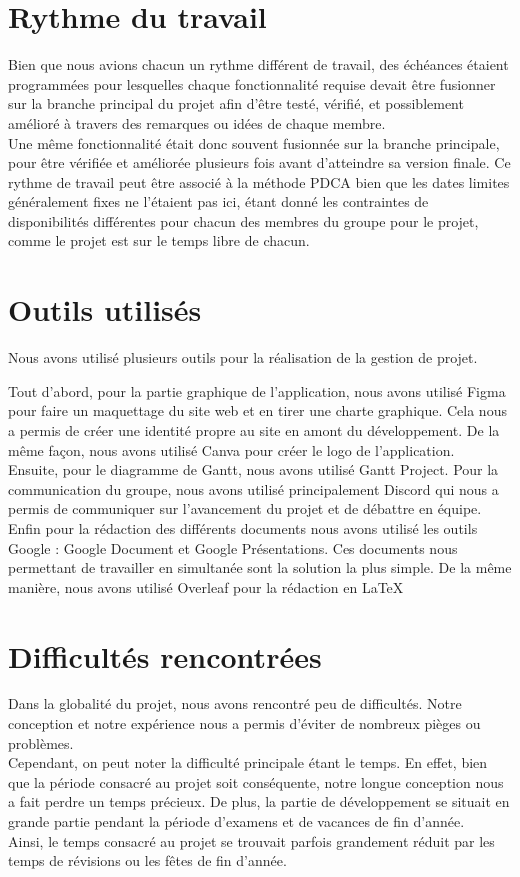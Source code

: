 \documentclass[12pt,titlepage]{report}
\begin{document}
\section{Rythme du travail}
Bien que nous avions chacun un rythme différent de travail, des échéances étaient programmées pour lesquelles chaque fonctionnalité requise devait être fusionner sur la branche principal du projet afin d’être testé, vérifié, et possiblement amélioré à travers des remarques ou idées de chaque membre. \\

Une même fonctionnalité était donc souvent fusionnée sur la branche principale, pour être vérifiée et améliorée plusieurs fois avant d’atteindre sa version finale. 
Ce rythme de travail peut être associé à la méthode PDCA bien que les dates limites généralement fixes ne l’étaient pas ici, étant donné les contraintes de disponibilités différentes pour chacun des membres du groupe pour le projet, comme le projet est sur le temps libre de chacun.

\section{Outils utilisés}
Nous avons utilisé plusieurs outils pour la réalisation de la gestion de projet.

Tout d’abord, pour la partie graphique de l’application, nous avons utilisé Figma pour faire un maquettage du site web et en tirer une charte graphique. Cela nous a permis de créer une identité propre au site en amont du développement. De la même façon, nous avons utilisé Canva pour créer le logo de l’application. \\
Ensuite, pour le diagramme de Gantt, nous avons utilisé Gantt Project. 
Pour la communication du groupe, nous avons utilisé principalement Discord qui nous a permis de communiquer sur l’avancement du projet et de débattre en équipe. \\
Enfin pour la rédaction des différents documents nous avons utilisé les outils Google : Google Document et Google Présentations. Ces documents nous permettant de travailler en simultanée sont la solution la plus simple. De la même manière, nous avons utilisé Overleaf pour la rédaction en LaTeX

\section{Difficultés rencontrées}

Dans la globalité du projet, nous avons rencontré peu de difficultés. Notre conception et notre expérience nous a permis d’éviter de nombreux pièges ou problèmes. \\Cependant, on peut noter la difficulté principale étant le temps. En effet, bien que la période consacré au projet soit conséquente, notre longue conception nous a fait perdre un temps précieux. De plus, la partie de développement se situait en grande partie pendant la période d’examens et de vacances de fin d’année. \\
Ainsi, le temps consacré au projet se trouvait parfois grandement réduit par les temps de révisions ou les fêtes de fin d’année. \\
\end{document}
